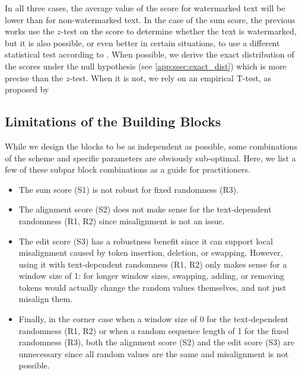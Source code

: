 In all three cases, the average value of the score for watermarked text will be lower than for non-watermarked text.
%
In the case of the sum score, the previous works use the $z$-test on the score to determine whether the text is watermarked, but it is also possible, or even better in certain situations, to use a different statistical test according to \citet{fernandez_three_2023}.
%
When possible, we derive the exact distribution of the scores under the null hypothesis (see \cref{app:ssec:exact_dist}) which is more precise than the $z$-test. When it is not, we rely on an empirical T-test, as proposed by \citet{kuditipudi_robust_2023}
%

\subsection{Limitations of the Building Blocks}\label{ssec:limit_blocks}

While we design the blocks to be as independent as possible, some combinations of the scheme and specific parameters are obviously sub-optimal.
%
Here, we list a few of these subpar block combinations as a guide for practitioners.
\begin{itemize}[leftmargin=\itemlm,itemsep=2pt]
    \item The sum score (S1) is not robust for fixed randomness (R3).
    \item The alignment score (S2) does not make sense for the text-dependent randomness (R1, R2) since misalignment is not an issue.
    \item The edit score (S3) has a robustness benefit since it can support local misalignment caused by token insertion, deletion, or swapping. However, using it with text-dependent randomness (R1, R2) only makes sense for a window size of 1: for longer window sizes, swapping, adding, or removing tokens would actually change the random values themselves, and not just misalign them.
    \item Finally, in the corner case when a window size of 0 for the text-dependent randomness (R1, R2) or when a random sequence length of 1 for the fixed randomness (R3), both the alignment score (S2) and the edit score (S3) are unnecessary since all random values are the same and misalignment is not possible.
\end{itemize}

